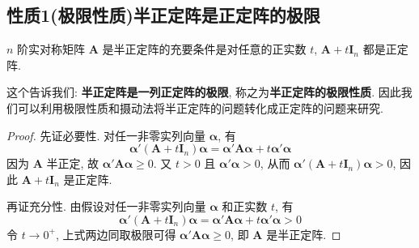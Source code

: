 \documentclass[../../main.tex]{subfiles}%
\begin{document}
\subsection{性质1(极限性质)半正定阵是正定阵的极限}

\begin{proposition}\label{proposition:半正定阵关于摄动的充要条件}
\(n\) 阶实对称矩阵 \(\boldsymbol{A}\) 是半正定阵的充要条件是对任意的正实数 \(t\), \(\boldsymbol{A}+t\boldsymbol{I}_n\) 都是正定阵.
\end{proposition}
\begin{remark}
这个告诉我们: \textbf{半正定阵是一列正定阵的极限}, 称之为\textbf{半正定阵的极限性质}. 因此我们可以利用极限性质和摄动法将半正定阵的问题转化成正定阵的问题来研究.
\end{remark}
\begin{proof}
先证必要性. 对任一非零实列向量 \(\boldsymbol{\alpha}\), 有
\[\boldsymbol{\alpha}'(\boldsymbol{A}+t\boldsymbol{I}_n)\boldsymbol{\alpha}=\boldsymbol{\alpha}'\boldsymbol{A}\boldsymbol{\alpha}+t\boldsymbol{\alpha}'\boldsymbol{\alpha}\]
因为 \(\boldsymbol{A}\) 半正定, 故 \(\boldsymbol{\alpha}'\boldsymbol{A}\boldsymbol{\alpha}\geqslant 0\). 又 \(t>0\) 且 \(\boldsymbol{\alpha}'\boldsymbol{\alpha}>0\), 从而 \(\boldsymbol{\alpha}'(\boldsymbol{A}+t\boldsymbol{I}_n)\boldsymbol{\alpha}>0\), 因此 \(\boldsymbol{A}+t\boldsymbol{I}_n\) 是正定阵.

再证充分性. 由假设对任一非零实列向量 \(\boldsymbol{\alpha}\) 和正实数 \(t\), 有
\[\boldsymbol{\alpha}'(\boldsymbol{A}+t\boldsymbol{I}_n)\boldsymbol{\alpha}=\boldsymbol{\alpha}'\boldsymbol{A}\boldsymbol{\alpha}+t\boldsymbol{\alpha}'\boldsymbol{\alpha}>0\]
令 \(t\to0^+\), 上式两边同取极限可得 \(\boldsymbol{\alpha}'\boldsymbol{A}\boldsymbol{\alpha}\geqslant 0\), 即 \(\boldsymbol{A}\) 是半正定阵. 
\end{proof}
\end{document}

